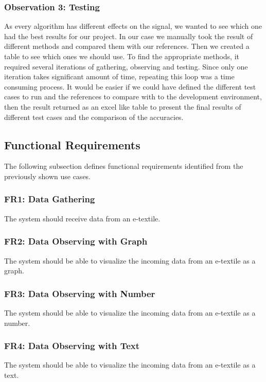\subsubsection{Observation 3: Testing}


As every algorithm has different effects on the signal, we wanted to see which one had the best results for our project. In our case we manually took the result of different methods and compared them with our references. Then we created a table to see which ones we should use. To find the appropriate methods, it required several iterations of gathering, observing and testing. Since only one iteration takes significant amount of time, repeating this loop was a time consuming process. It would be easier if we could have defined the different test cases to run and the references to compare with to the development environment, then the result returned as an excel like table to present the final results of different test cases and the comparison of the accuracies.

\subsection{Functional Requirements}
The following subsection defines functional requirements identified from the previously shown use cases.

\subsubsection{FR1: Data Gathering}
The system should receive data from an e-textile.

\subsubsection{FR2: Data Observing with Graph}
The system should be able to visualize the incoming data from an e-textile as a graph.

\subsubsection{FR3: Data Observing with Number}
The system should be able to visualize the incoming data from an e-textile as a number.

\subsubsection{FR4: Data Observing with Text}
The system should be able to visualize the incoming data from an e-textile as a text.


